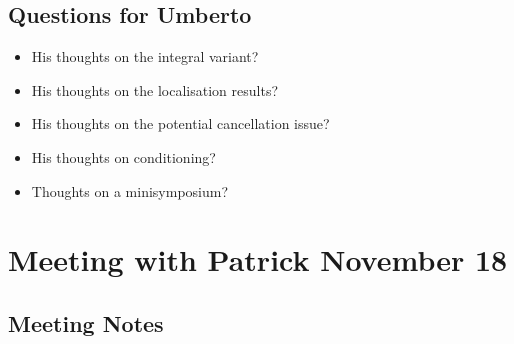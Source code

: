 \documentclass[12pt,a4paper]{article}
\begin{document}
\subsection{Questions for Umberto}

\begin{itemize}
    \item His thoughts on the integral variant?
    \item His thoughts on the localisation results?
    \item His thoughts on the potential cancellation issue? 
    \item His thoughts on conditioning? 
    \item Thoughts on a minisymposium?
\end{itemize}

\newpage

\section{Meeting with Patrick November 18}

\subsection{Meeting Notes}
\end{document}
